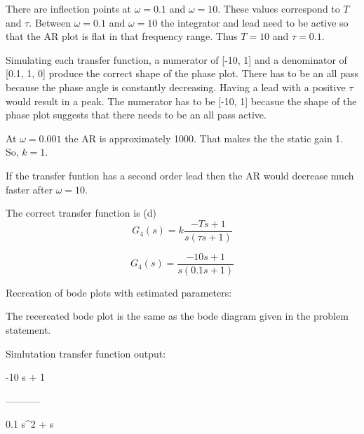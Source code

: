 \documentclass[12pt]{article}
\begin{document}
\begin{enumerate}
    There are inflection points at $\omega = 0.1$ and $\omega = 10$. These values correspond to $T$ and $\tau$. Between $\omega = 0.1$ and $\omega = 10$ the integrator and lead need to be active so that the AR plot is flat in that frequency range. Thus $\boxed{T=10}$ and $\boxed{\tau=0.1}$.

    Simulating each transfer function, a numerator of [-10, 1] and a denominator of [0.1, 1, 0] produce the correct shape of the phase plot. There has to be an all pass because the phase angle is constantly decreasing. Having a lead with a positive $\tau$ would result in a peak. The numerator has to be [-10, 1] becasue the shape of the phase plot suggests that there needs to be an all pass active.

    At $\omega = 0.001$ the AR is approximately 1000. That makes the the static gain 1. So, $\boxed{k=1}$.

    If the transfer funtion has a second order lead then the AR would decrease much faster after $\omega = 10$.

    The correct transfer function is (d)
    \[
        G_4(s) = k \frac{-Ts + 1}{s (\tau s + 1)}  
    \]

    \[
        G_4(s) = \frac{-10s + 1}{s (0.1 s + 1)}  
    \]

    Recreation of bode plots with estimated parameters:

    \begin{center}
        
    \end{center}

    The recereated bode plot is the same as the bode diagram given in the problem statement.

    Simlutation transfer function output:

    -10 s + 1
    
    -----------
    
    0.1 s\string^2 + s

\end{enumerate}
\end{document}
